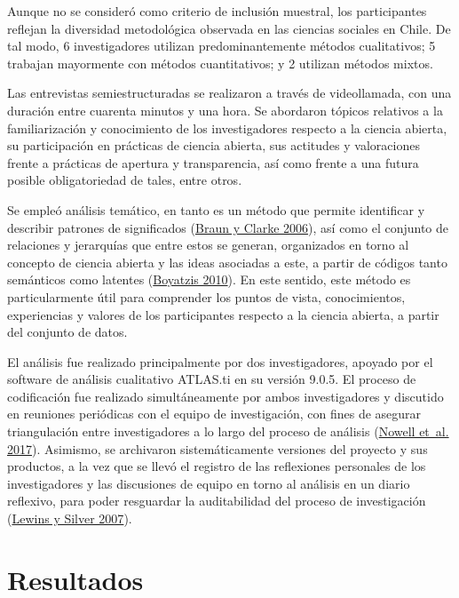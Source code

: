 \documentclass[
  letterpaper,
  DIV=11,
  numbers=noendperiod]{scrreprt}
\begin{document}
Aunque no se consideró como criterio de inclusión muestral, los
participantes reflejan la diversidad metodológica observada en las
ciencias sociales en Chile. De tal modo, 6 investigadores utilizan
predominantemente métodos cualitativos; 5 trabajan mayormente con
métodos cuantitativos; y 2 utilizan métodos mixtos.

Las entrevistas semiestructuradas se realizaron a través de
videollamada, con una duración entre cuarenta minutos y una hora. Se
abordaron tópicos relativos a la familiarización y conocimiento de los
investigadores respecto a la ciencia abierta, su participación en
prácticas de ciencia abierta, sus actitudes y valoraciones frente a
prácticas de apertura y transparencia, así como frente a una futura
posible obligatoriedad de tales, entre otros.

Se empleó análisis temático, en tanto es un método que permite
identificar y describir patrones de significados
(\protect\hyperlink{ref-braun_thematic_2006}{Braun y Clarke 2006}), así
como el conjunto de relaciones y jerarquías que entre estos se generan,
organizados en torno al concepto de ciencia abierta y las ideas
asociadas a este, a partir de códigos tanto semánticos como latentes
(\protect\hyperlink{ref-boyatzis_thematic_2010}{Boyatzis 2010}). En este
sentido, este método es particularmente útil para comprender los puntos
de vista, conocimientos, experiencias y valores de los participantes
respecto a la ciencia abierta, a partir del conjunto de datos.

El análisis fue realizado principalmente por dos investigadores, apoyado
por el software de análisis cualitativo ATLAS.ti en su versión 9.0.5. El
proceso de codificación fue realizado simultáneamente por ambos
investigadores y discutido en reuniones periódicas con el equipo de
investigación, con fines de asegurar triangulación entre investigadores
a lo largo del proceso de análisis
(\protect\hyperlink{ref-nowell2017}{Nowell et~al. 2017}). Asimismo, se
archivaron sistemáticamente versiones del proyecto y sus productos, a la
vez que se llevó el registro de las reflexiones personales de los
investigadores y las discusiones de equipo en torno al análisis en un
diario reflexivo, para poder resguardar la auditabilidad del proceso de
investigación (\protect\hyperlink{ref-lewins2007}{Lewins y Silver
2007}).

\hypertarget{resultados}{%
\chapter{Resultados}\label{resultados}}
\end{document}
